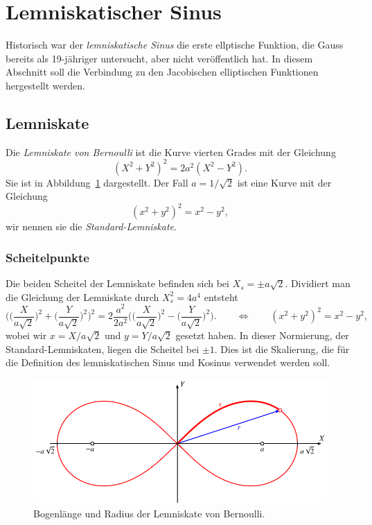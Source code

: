 %
%
%
\section{Lemniskatischer Sinus
\label{buch:elliptisch:section:lemniskate}}
Historisch war der {\em lemniskatische Sinus} die erste ellptische
Funktion, die Gauss bereits als 19-jähriger untersucht, aber nicht 
veröffentlich hat.
In diesem Abschnitt soll die Verbindung zu den Jacobischen
elliptischen Funktionen hergestellt werden.

%
%
\subsection{Lemniskate
\label{buch:gemotrie:subsection:lemniskate}}
Die {\em Lemniskate von Bernoulli} ist die Kurve vierten Grades
mit der Gleichung
%
\begin{equation}
(X^2+Y^2)^2 = 2a^2(X^2-Y^2).
\label{buch:elliptisch:eqn:lemniskate}
\end{equation}
Sie ist in Abbildung~\ref{buch:elliptisch:fig:lemniskate}
dargestellt.
Der Fall $a=1/\!\sqrt{2}$ ist eine Kurve mit der Gleichung
\[
(x^2+y^2)^2 = x^2-y^2,
\]
wir nennen sie die {\em Standard-Lemniskate}.

\subsubsection{Scheitelpunkte}
Die beiden Scheitel der Lemniskate befinden sich bei $X_s=\pm a\!\sqrt{2}$.
Dividiert man die Gleichung der Lemniskate durch $X_s^2=4a^4$ entsteht 
\begin{equation}
\biggl(
\biggl(\frac{X}{a\!\sqrt{2}}\biggr)^2
+
\biggl(\frac{Y}{a\!\sqrt{2}}\biggr)^2
\biggr)^2
=
2\frac{a^2}{2a^2}\biggl(
\biggl(\frac{X}{a\!\sqrt{2}}\biggr)^2
-
\biggl(\frac{Y}{a\!\sqrt{2}}\biggr)^2
\biggr).
\qquad
\Leftrightarrow
\qquad
(x^2+y^2)^2 = x^2-y^2,
\label{buch:elliptisch:eqn:lemniskatenormiert}
\end{equation}
wobei wir $x=X/a\!\sqrt{2}$ und $y=Y/a\!\sqrt{2}$ gesetzt haben.
In dieser Normierung, der Standard-Lemniskaten, liegen die Scheitel
bei $\pm 1$.
Dies ist die Skalierung, die für die Definition des lemniskatischen
Sinus und Kosinus verwendet werden soll.
\begin{figure}
\centering
\includegraphics{chapters/110-elliptisch/images/lemniskate.pdf}
\caption{Bogenlänge und Radius der Lemniskate von Bernoulli.
\label{buch:elliptisch:fig:lemniskate}}
\end{figure}

